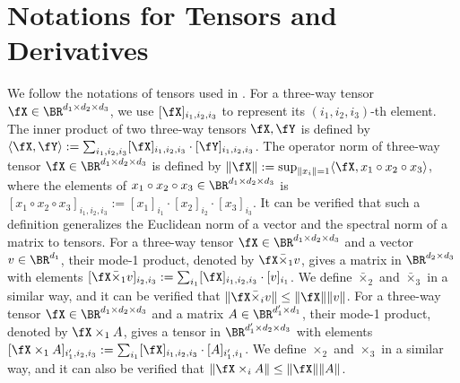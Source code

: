 
\newpage

\section{Notations for Tensors and Derivatives} \label{apx:tensor}
We follow the notations of tensors used in \cite{kolda2009tensor}.
For a three-way tensor $\fX \in \BR^{d_1 \times d_2 \times d_3}$,
we use $ [\fX]_{i_1,i_2,i_3}$ to represent its $(i_1,i_2,i_3)$-th element.
The inner product of two three-way tensors $\fX,\fY$ is defined by $\langle \fX, \fY \rangle := \sum_{i_1,i_2,i_3} [\fX]_{i_1,i_2,i_3} \cdot [\fY]_{i_1,i_2,i_3}$. The operator norm of three-way tensor $\fX \in \BR^{d_1 \times d_2 \times d_3}$ is defined by $\Vert \fX \Vert:= \sup_{\Vert x_i \Vert =1} \langle \fX, x_1 \circ x_2 \circ x_3 \rangle $, where the elements of  $x_1 \circ x_2 \circ x_3 \in \BR^{d_1 \times d_2 \times d_3}$ is $ [x_1 \circ x_2 \circ x_3]_{i_1,i_2,i_3} := [x_1]_{i_1} \cdot  [x_2]_{i_2} \cdot [x_3]_{i_3} $. 
It can be verified that such a definition generalizes the Euclidean norm of a vector and the spectral norm of a matrix to tensors.
For a three-way tensor  $ \fX \in \BR^{d_1 \times d_2 \times d_3}$ and a vector $v \in \BR^{d_1}$, their mode-1 product, denoted by $\fX \bar \times_1 v$, gives a matrix in $\BR^{d_2 \times d_3}$ with elements $ [\fX \bar \times_1 v]_{i_2,i_3} := \sum_{i_1} [\fX]_{i_1,i_2,i_3} \cdot [v]_{i_1} $.
We define $\bar \times_2$ and $\bar \times_3$ in a similar way, and it can  be verified that 
$ \Vert \fX \bar \times_i v \Vert \le \Vert \fX \Vert \Vert v \Vert$.
For a three-way tensor $\fX \in \BR^{d_1 \times d_2 \times d_3}$ and a matrix $A \in \BR^{d_1' \times d_1}$, their mode-1 product, denoted by $ \fX \times_1 A$, gives a tensor in $\BR^{d_1' \times d_2 \times d_3}$ with elements  $ [\fX \times_1 A]_{i_1',i_2,i_3} := \sum_{i_1} [\fX]_{i_1,i_2,i_3} \cdot [A]_{i_1',i_1} $. We define $ \times_2$ and $ \times_3$ in a similar way, and it can also be verified that 
$ \Vert \fX \times_i A \Vert \le \Vert \fX \Vert \Vert A \Vert$.

